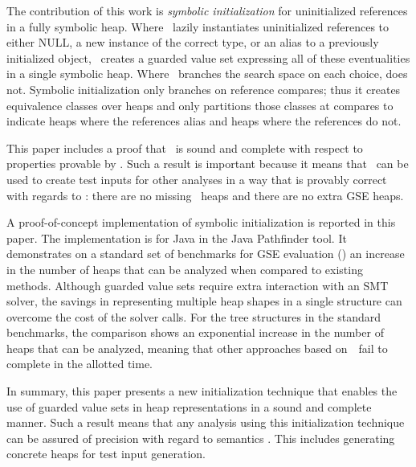 The contribution of this work is \emph{symbolic initialization} for 
uninitialized references in a fully symbolic heap. Where \gsetxt\ lazily
instantiates uninitialized references to either NULL, a new instance
of the correct type, or an alias to a previously initialized object, \symtxt\ creates a guarded value set
expressing all of these eventualities in a single symbolic heap. Where
\gsetxt\ branches the search space on each choice, \symtxt{} does not. Symbolic initialization only branches on reference compares; thus it creates equivalence classes over heaps and only partitions those classes at compares to indicate heaps where the references
alias and heaps where the references do not.

This paper includes a proof that \symtxt\ is sound and
complete with respect to properties provable by \gsetxt. Such a result is
important because it means that \symtxt\ can be used to
create test inputs for other analyses in a way that is provably
correct with regards to \gsetxt: there are no missing \gsetxt\ heaps and there are
no extra GSE heaps.

A proof-of-concept implementation of symbolic initialization is
reported in this paper. The implementation is for Java in the Java
Pathfinder tool. It demonstrates on a standard set of benchmarks for GSE evaluation (\cite{PAPERSESTABLISHINGBENCHMARKSET}) an increase in the number of heaps that can be analyzed when compared to existing ~\gsetxt{} methods. Although guarded value
sets require extra interaction with an SMT solver, the
savings in representing multiple heap shapes in a single
structure can overcome the cost of the solver calls. For the tree structures in the standard benchmarks, the
comparison shows an exponential increase in the number of heaps that
can be analyzed, meaning that other
approaches based on~\gsetxt\ fail to complete in the allotted time.

In summary, this paper presents a new initialization technique that
enables the use of guarded value sets in heap representations in a
sound and complete manner. Such a result means that any analysis using
this initialization technique can be assured of precision with regard
to \gsetxt{} semantics \cite{THINGSTHATBENEFIT}. This includes generating concrete heaps for test input generation.
